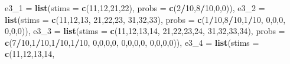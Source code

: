 \documentclass[,man,floatsintext]{apa6}
\newenvironment{Shaded}{\begin{snugshade}}{\end{snugshade}}
\newcommand{\DataTypeTok}[1]{\textcolor[rgb]{0.13,0.29,0.53}{#1}}
\newcommand{\DecValTok}[1]{\textcolor[rgb]{0.00,0.00,0.81}{#1}}
\newcommand{\KeywordTok}[1]{\textcolor[rgb]{0.13,0.29,0.53}{\textbf{#1}}}
\newcommand{\NormalTok}[1]{#1}
\newcommand{\OperatorTok}[1]{\textcolor[rgb]{0.81,0.36,0.00}{\textbf{#1}}}
\begin{document}
\begin{Shaded}
\begin{Highlighting}[]
  \DataTypeTok{e3_1 =} \KeywordTok{list}\NormalTok{(}\DataTypeTok{stims =} \KeywordTok{c}\NormalTok{(}\DecValTok{11}\NormalTok{,}\DecValTok{12}\NormalTok{,}\DecValTok{21}\NormalTok{,}\DecValTok{22}\NormalTok{),}
              \DataTypeTok{probs =} \KeywordTok{c}\NormalTok{(}\DecValTok{2}\OperatorTok{/}\DecValTok{10}\NormalTok{,}\DecValTok{8}\OperatorTok{/}\DecValTok{10}\NormalTok{,}\DecValTok{0}\NormalTok{,}\DecValTok{0}\NormalTok{)),}
  \DataTypeTok{e3_2 =} \KeywordTok{list}\NormalTok{(}\DataTypeTok{stims =} \KeywordTok{c}\NormalTok{(}\DecValTok{11}\NormalTok{,}\DecValTok{12}\NormalTok{,}\DecValTok{13}\NormalTok{,}
                        \DecValTok{21}\NormalTok{,}\DecValTok{22}\NormalTok{,}\DecValTok{23}\NormalTok{,}
                        \DecValTok{31}\NormalTok{,}\DecValTok{32}\NormalTok{,}\DecValTok{33}\NormalTok{),}
              \DataTypeTok{probs =} \KeywordTok{c}\NormalTok{(}\DecValTok{1}\OperatorTok{/}\DecValTok{10}\NormalTok{,}\DecValTok{8}\OperatorTok{/}\DecValTok{10}\NormalTok{,}\DecValTok{1}\OperatorTok{/}\DecValTok{10}\NormalTok{,}
                        \DecValTok{0}\NormalTok{,}\DecValTok{0}\NormalTok{,}\DecValTok{0}\NormalTok{,}
                        \DecValTok{0}\NormalTok{,}\DecValTok{0}\NormalTok{,}\DecValTok{0}\NormalTok{)),}
  \DataTypeTok{e3_3 =}  \KeywordTok{list}\NormalTok{(}\DataTypeTok{stims =} \KeywordTok{c}\NormalTok{(}\DecValTok{11}\NormalTok{,}\DecValTok{12}\NormalTok{,}\DecValTok{13}\NormalTok{,}\DecValTok{14}\NormalTok{,}
                         \DecValTok{21}\NormalTok{,}\DecValTok{22}\NormalTok{,}\DecValTok{23}\NormalTok{,}\DecValTok{24}\NormalTok{,}
                         \DecValTok{31}\NormalTok{,}\DecValTok{32}\NormalTok{,}\DecValTok{33}\NormalTok{,}\DecValTok{34}\NormalTok{),}
               \DataTypeTok{probs =} \KeywordTok{c}\NormalTok{(}\DecValTok{7}\OperatorTok{/}\DecValTok{10}\NormalTok{,}\DecValTok{1}\OperatorTok{/}\DecValTok{10}\NormalTok{,}\DecValTok{1}\OperatorTok{/}\DecValTok{10}\NormalTok{,}\DecValTok{1}\OperatorTok{/}\DecValTok{10}\NormalTok{,}
                         \DecValTok{0}\NormalTok{,}\DecValTok{0}\NormalTok{,}\DecValTok{0}\NormalTok{,}\DecValTok{0}\NormalTok{,}
                         \DecValTok{0}\NormalTok{,}\DecValTok{0}\NormalTok{,}\DecValTok{0}\NormalTok{,}\DecValTok{0}\NormalTok{,}
                         \DecValTok{0}\NormalTok{,}\DecValTok{0}\NormalTok{,}\DecValTok{0}\NormalTok{,}\DecValTok{0}\NormalTok{)),}
  \DataTypeTok{e3_4 =}  \KeywordTok{list}\NormalTok{(}\DataTypeTok{stims =} \KeywordTok{c}\NormalTok{(}\DecValTok{11}\NormalTok{,}\DecValTok{12}\NormalTok{,}\DecValTok{13}\NormalTok{,}\DecValTok{14}\NormalTok{,}

\end{Highlighting}
\end{Shaded}
\end{document}
